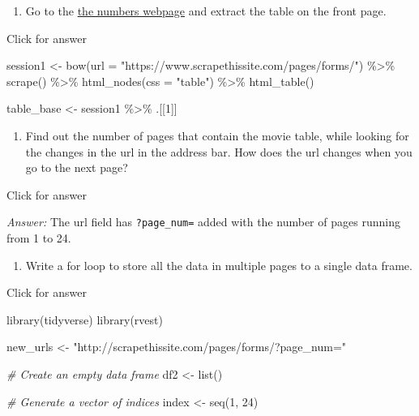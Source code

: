 \documentclass[
]{book}
\newenvironment{Shaded}{\begin{snugshade}}{\end{snugshade}}
\newcommand{\AttributeTok}[1]{\textcolor[rgb]{0.77,0.63,0.00}{#1}}
\newcommand{\CommentTok}[1]{\textcolor[rgb]{0.56,0.35,0.01}{\textit{#1}}}
\newcommand{\DecValTok}[1]{\textcolor[rgb]{0.00,0.00,0.81}{#1}}
\newcommand{\FunctionTok}[1]{\textcolor[rgb]{0.00,0.00,0.00}{#1}}
\newcommand{\NormalTok}[1]{#1}
\newcommand{\OtherTok}[1]{\textcolor[rgb]{0.56,0.35,0.01}{#1}}
\newcommand{\SpecialCharTok}[1]{\textcolor[rgb]{0.00,0.00,0.00}{#1}}
\newcommand{\StringTok}[1]{\textcolor[rgb]{0.31,0.60,0.02}{#1}}
\providecommand{\tightlist}{%
  \setlength{\itemsep}{0pt}\setlength{\parskip}{0pt}}
\begin{document}
\begin{enumerate}
\def\labelenumi{\arabic{enumi}.}
\tightlist
\item
  Go to the \href{https://www.scrapethissite.com/pages/forms/}{the numbers webpage} and extract the table on the front page.
\end{enumerate}

Click for answer

\begin{Shaded}
\begin{Highlighting}[]
\NormalTok{session1 }\OtherTok{\textless{}{-}} \FunctionTok{bow}\NormalTok{(}\AttributeTok{url =} \StringTok{"https://www.scrapethissite.com/pages/forms/"}\NormalTok{) }\SpecialCharTok{\%\textgreater{}\%} \FunctionTok{scrape}\NormalTok{() }\SpecialCharTok{\%\textgreater{}\%}
  \FunctionTok{html\_nodes}\NormalTok{(}\AttributeTok{css =} \StringTok{"table"}\NormalTok{) }\SpecialCharTok{\%\textgreater{}\%}
  \FunctionTok{html\_table}\NormalTok{()}

\NormalTok{table\_base }\OtherTok{\textless{}{-}}\NormalTok{ session1 }\SpecialCharTok{\%\textgreater{}\%}\NormalTok{ .[[}\DecValTok{1}\NormalTok{]]}
\end{Highlighting}
\end{Shaded}

\begin{enumerate}
\def\labelenumi{\arabic{enumi}.}
\setcounter{enumi}{1}
\tightlist
\item
  Find out the number of pages that contain the movie table, while looking for the changes in the url in the address bar. How does the url changes when you go to the next page?
\end{enumerate}

Click for answer

\emph{Answer:} The url field has \texttt{?page\_num=} added with the number of pages running from 1 to 24.

\begin{enumerate}
\def\labelenumi{\arabic{enumi}.}
\setcounter{enumi}{2}
\tightlist
\item
  Write a for loop to store all the data in multiple pages to a single data frame.
\end{enumerate}

Click for answer

\begin{Shaded}
\begin{Highlighting}[]
\FunctionTok{library}\NormalTok{(tidyverse)}
\FunctionTok{library}\NormalTok{(rvest)}

\NormalTok{new\_urls }\OtherTok{\textless{}{-}} \StringTok{"http://scrapethissite.com/pages/forms/?page\_num="}

\CommentTok{\# Create an empty data frame}
\NormalTok{df2 }\OtherTok{\textless{}{-}} \FunctionTok{list}\NormalTok{()}

\CommentTok{\# Generate a vector of indices}
\NormalTok{index }\OtherTok{\textless{}{-}} \FunctionTok{seq}\NormalTok{(}\DecValTok{1}\NormalTok{, }\DecValTok{24}\NormalTok{)}
\end{Highlighting}
\end{Shaded}
\end{document}
